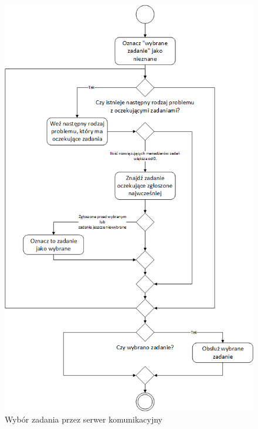 \documentclass{report}
\begin{document}
	\begin{figure}[h]
		\centering
		\caption{Wybór zadania przez serwer komunikacyjny}
		\includegraphics[width=\textwidth]{img/CommunicationServer-SelectTask.png}
	\end{figure}
	
\end{document}
